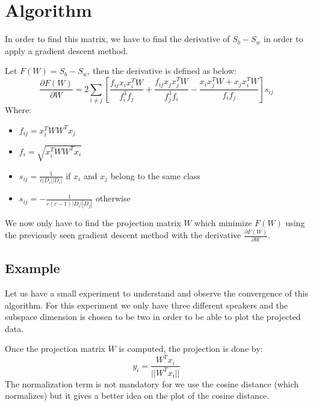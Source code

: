 \documentclass{techrep}
\begin{document}
\section{Algorithm}

In order to find this matrix, we have to find the derivative of $S_b -
S_w$ in order to apply a gradient descent method. %

Let $F(W) = S_b - S_w$, then the derivative is defined as below:
$$\frac{\partial{F(W)}}{\partial{W}} =
2\sum_{i\neq{}j}\left[\frac{f_{ij}x_ix_i^TW}{f_i^3f_j} +
  \frac{f_{ij}x_jx_j^TW}{f_j^3f_i} - \frac{x_ix_j^TW + x_jx_i^TW}{f_if_j}\right]s_{ij}$$
Where:
\begin{itemize}
\item $f_{ij} = x_i^TWW^Tx_j$
\item $f_i = \sqrt{x_i^TWW^Tx_i}$
\item $s_{ij} = \frac{1}{c|D_i||D_i|}$ if $x_i$ and $x_j$ belong to the same class
\item $s_{ij} = -\frac{1}{c(c-1)|D_i||D_j|}$ otherwise
\end{itemize}

We now only have to find the projection matrix $W$ which minimize
$F(W)$ using the previously seen gradient descent method with the
derivative $\frac{\partial{F(W)}}{\partial{W}}$.


\subsection{Example}

Let us have a small experiment to understand and observe the
convergence of this algorithm.  For this experiment we only have three
different speakers and the subspace dimension is chosen to be two in
order to be able to plot the projected data.

Once the projection matrix $W$ is computed, the projection is done by:
$$y_i = \frac{W^Tx_i}{||W^Tx_i||}$$ The normalization term is not
mandatory for we use the cosine distance (which normalizes) but it
gives a better idea on the plot of the cosine distance.
\end{document}
